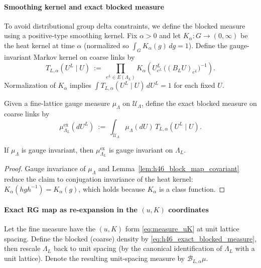 \paragraph*{Smoothing kernel and exact blocked measure}

To avoid distributional group delta constraints, we define the blocked measure using a positive-type smoothing kernel.
Fix $\alpha>0$ and let $K_\alpha:G\to(0,\infty)$ be the heat kernel at time $\alpha$ (normalized so $\int_G K_\alpha(g)\,dg=1$).
Define the gauge-invariant Markov kernel on coarse links by
\begin{equation}\label{eq:h46_markov_kernel}
T_{L,\alpha}(U^L\mid U)\ :=\ \prod_{e^L\in E(\Lambda_L)} K_\alpha\!\left(U^L_{e^L}\,\bigl((B_LU)_{e^L}\bigr)^{-1}\right).
\end{equation}
Normalization of $K_\alpha$ implies $\int T_{L,\alpha}(U^L\mid U)\,dU^L=1$ for each fixed $U$.

Given a fine-lattice gauge measure $\mu_\Lambda$ on $\mathcal U_\Lambda$, define the exact blocked measure on coarse links by
\begin{equation}\label{eq:h46_exact_blocked_measure}
\mu^{\mathrm{ex}}_{\Lambda_L}(dU^L)\ :=\ \int_{\mathcal U_\Lambda} \mu_\Lambda(dU)\,T_{L,\alpha}(U^L\mid U).
\end{equation}

\begin{lemma}\label{lem:h46_blocked_gauge_invariant}
If $\mu_\Lambda$ is gauge invariant, then $\mu^{\mathrm{ex}}_{\Lambda_L}$ is gauge invariant on $\Lambda_L$.
\end{lemma}

\begin{proof}
Gauge invariance of $\mu_\Lambda$ and Lemma~\ref{lem:h46_block_map_covariant} reduce the claim to conjugation invariance of the heat kernel:
$K_\alpha(hgh^{-1})=K_\alpha(g)$, which holds because $K_\alpha$ is a class function.
\end{proof}

\paragraph*{Exact RG map as re-expansion in the $(u,K)$ coordinates}

Let the fine measure have the $(u,K)$ form \eqref{eq:measure_uK} at unit lattice spacing.
Define the blocked (coarse) density by \eqref{eq:h46_exact_blocked_measure}, then rescale $\Lambda_L$ back to unit spacing
(by the canonical identification of $\Lambda_L$ with a unit lattice). Denote the resulting unit-spacing measure by
$\mathcal B_{L,\alpha}\mu$.

